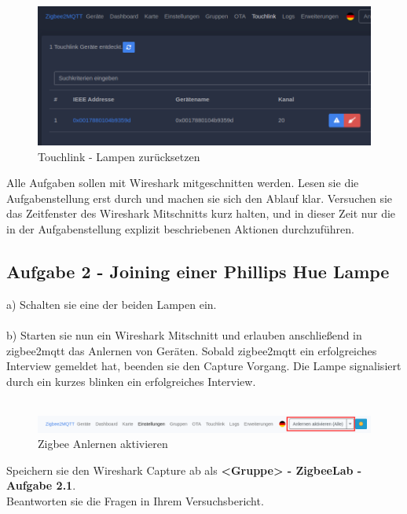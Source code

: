 \begin{figure}[H]
    \centering
    \includegraphics[width=1\textwidth]{media/z2m-touchlink.png}
    \caption{Touchlink - Lampen zurücksetzen}
\end{figure}

\begin{Hinweis}
    Alle Aufgaben sollen mit Wireshark mitgeschnitten werden. Lesen sie die Aufgabenstellung erst durch und machen sie sich den Ablauf klar. Versuchen sie das 
    Zeitfenster des Wireshark Mitschnitts kurz halten, und in dieser Zeit nur die in der Aufgabenstellung explizit beschriebenen Aktionen durchzuführen.
\end{Hinweis}

\subsection{Aufgabe 2 - Joining einer Phillips Hue Lampe}
a) Schalten sie eine der beiden Lampen ein.\\\\
b) Starten sie nun ein Wireshark Mitschnitt und erlauben anschließend in zigbee2mqtt das Anlernen von Geräten. Sobald zigbee2mqtt ein erfolgreiches Interview gemeldet hat, 
beenden sie den Capture Vorgang. Die Lampe signalisiert durch ein kurzes blinken ein erfolgreiches Interview.\\\\

\begin{figure}[H]
    \centering
    \includegraphics[width=1\textwidth]{media/Z2M-Anlernen.png}
    \caption{Zigbee Anlernen aktivieren}
\end{figure}

\begin{Aufgabe}
    Speichern sie den Wireshark Capture ab als \textbf{\grqq <Gruppe> - ZigbeeLab - Aufgabe 2.1\grqq{}}. \\
    Beantworten sie die Fragen in Ihrem Versuchsbericht.
\end{Aufgabe}

